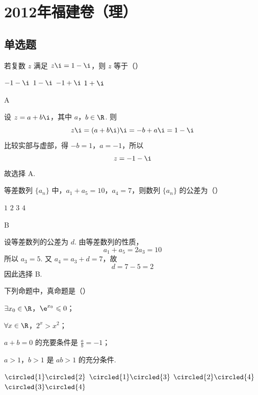 \chapter{2012年福建卷（理）}

\section{单选题}

\begin{problem}
若复数 \(z\) 满足 \(z\i = 1 - \i\)，则 \(z\) 等于（\quad）

\choices
    {\(-1 - \i\)}
    {\(1 - \i\)}
    {\(-1 + \i\)}
    {\(1 + \i\)}
\end{problem}

\begin{answer}
A
\end{answer}

\begin{solution}
设 \(z=a+b\i\)，其中 \(a\)，\(b\in\R\). 则
\[
z\i=(a+b\i)\i=-b+a\i=1-\i
\]
比较实部与虚部，得 \(-b=1\)，\(a=-1\)，所以
\[
z=-1-\i
\]
故选择 A.
\end{solution}

\begin{problem}
等差数列 \(\{a_{n}\}\) 中，\(a_{1} + a_{5} = 10\)，\(a_{4} = 7\)，则数列 \(\{a_{n}\}\) 的公差为（\quad）

\choices
    {\(1\)}
    {\(2\)}
    {\(3\)}
    {\(4\)}
\end{problem}

\begin{answer}
B
\end{answer}

\begin{solution}
设等差数列的公差为 \(d\). 由等差数列的性质，
\[
a_{1}+a_{5}=2a_{3}=10
\]
所以 \(a_{3}=5\). 又 \(a_{4}=a_{3}+d=7\)，故
\[
d=7-5=2
\]
因此选择 B.
\end{solution}

\begin{problem}
下列命题中，真命题是（\quad）

\begin{circlelist}
\item \(\exists x_{0} \in \R\)，\(\e^{x_{0}} \leqslant 0\)；
\item \(\forall x \in \R\)，\(2^{x} > x^{2}\)；
\item \(a + b = 0\) 的充要条件是 \(\frac{a}{b} = -1\)；
\item \(a > 1\)，\(b > 1\) 是 \(ab > 1\) 的充分条件.
\end{circlelist}

\choices
    {\(\circled{1}\circled{2}\)}
    {\(\circled{1}\circled{3}\)}
    {\(\circled{2}\circled{4}\)}
    {\(\circled{3}\circled{4}\)}
\end{problem}

